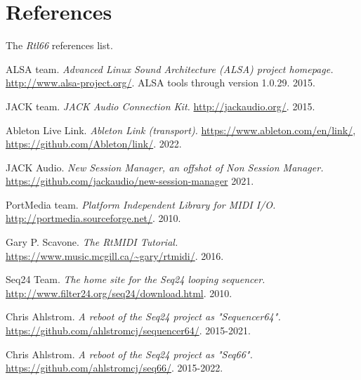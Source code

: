 %
%
%

\section{References}
\label{sec:references}

   The \textsl{Rtl66} references list.

{\RaggedRight
\begin{thebibliography}{99}

   ALSA team.
   \emph{Advanced Linux Sound Architecture (ALSA) project homepage.}
   \url{http://www.alsa-project.org/}.
   ALSA tools through version 1.0.29.
   2015.

   JACK team.
   \emph{JACK Audio Connection Kit.}
   \url{http://jackaudio.org/}.
   2015.

   Ableton Live Link.
   \emph{Ableton Link (transport).}
   \url{https://www.ableton.com/en/link/},
   \url{https://github.com/Ableton/link/}.
   2022.

   JACK Audio.
   \emph{New Session Manager, an offshot of Non Session Manager.}
   \url{https://github.com/jackaudio/new-session-manager}
   2021.

   PortMedia team.
   \emph{Platform Independent Library for MIDI I/O.}
   \url{http://portmedia.sourceforge.net/}.
   2010.

   Gary P. Scavone.
   \emph{The RtMIDI Tutorial.}
   \url{https://www.music.mcgill.ca/~gary/rtmidi/}.
   2016.

   Seq24 Team.
   \emph{The home site for the Seq24 looping sequencer.}
   \url{http://www.filter24.org/seq24/download.html}.
   2010.

   Chris Ahlstrom.
   \emph{A reboot of the Seq24 project as "Sequencer64".}
   \url{https://github.com/ahlstromcj/sequencer64/}.
   2015-2021.

   Chris Ahlstrom.
   \emph{A reboot of the Seq24 project as "Seq66".}
   \url{https://github.com/ahlstromcj/seq66/}.
   2015-2022.

\end{thebibliography}
}

